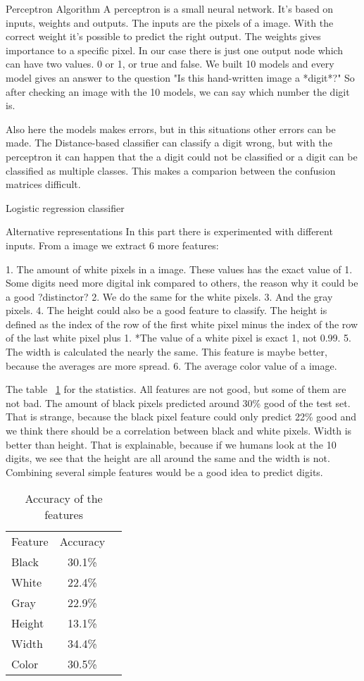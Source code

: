 \documentclass{article}
\begin{document}
Perceptron Algorithm
A perceptron is a small neural network. It's based on inputs, weights and outputs. The inputs are the pixels of a image. With the correct weight it's possible to predict the right output. The weights gives importance to a specific pixel. In our case there is just one output node which can have two values. 0 or 1, or true and false. We built 10 models and every model gives an answer to the question "Is this hand-written image a *digit*?" So after checking an image with the 10 models, we can say which number the digit is.

Also here the models makes errors, but in this situations other errors can be made. The Distance-based classifier can classify a digit wrong, but with the perceptron it can happen that the a digit could not be classified or a digit can be classified as multiple classes. This makes a comparion between the confusion matrices difficult. 

Logistic regression classifier

Alternative representations
In this part there is experimented with different inputs. From a image we extract 6 more features:

1. The amount of white pixels in a image. These values has the exact value of 1. Some digits need more digital ink compared to others, the reason why it could be a good ?distinctor? 
2. We do the same for the white pixels.
3. And the gray pixels.
4. The height could also be a good feature to classify. The height is defined as the index of the row of the first white pixel minus the index of the row of the last white pixel plus 1. *The value of a white pixel is exact 1, not 0.99. 
5. The width is calculated the nearly the same. This feature is maybe better, because the averages are more spread.
6. The average color value of a image. 

The table ~\ref{tab:ac} for the statistics. All features are not good, but some of them are not bad. The amount of black pixels predicted around 30\% good of the test set. That is strange, because the black pixel feature could only predict 22\% good and we think there should be a correlation between black and white pixels. Width is better than height. That is explainable, because if we humans look at the 10 digits, we see that the height are all around the same and the width is not. Combining several simple features would be a good idea to predict digits.

\begin{table}
	\begin{tabular}{l c r}
		Feature & Accuracy \\
		Black & 30.1\% \\
		White & 22.4\% \\
		Gray & 22.9\% \\
		Height & 13.1\% \\
		Width & 34.4\% \\
		Color & 30.5\% \\
	\end{tabular}
	\label{tab:ac}
	\caption{Accuracy of the features}
\end{table}
\end{document}
